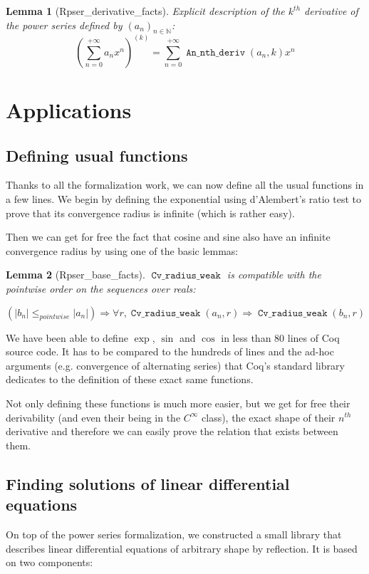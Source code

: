 \documentclass[submission,copyright]{eptcs}
\newcommand{\N}{\mathbb{N}}
\DeclareMathOperator{\Dn}{\mathtt{An\_nth\_deriv}}
\DeclareMathOperator{\cvrw}{\mathtt{Cv\_radius\_weak}}
\newtheorem{lemma}{Lemma}
\begin{document}
\begin{lemma}[Rpser\_derivative\_facts] Explicit description of
the $k^{th}$ derivative of the power series defined by $(a_n)_{n\in \N}$:
$$(\sum_{n=0}^{+\infty} a_n x^n)^{(k)} = \sum_{n=0}^{+\infty}
\Dn{}(a_n,k) x^n$$\end{lemma}

\section{Applications}

\subsection{Defining usual functions}

Thanks to all the formalization work, we can now define all the usual
functions in a few lines. We begin by defining the exponential using
d'Alembert's ratio test to prove that its convergence radius is infinite
(which is rather easy).

Then we can get for free the fact that cosine and sine also have an
infinite convergence radius by using one of the basic lemmas:

\begin{lemma}[Rpser\_base\_facts] $\cvrw{}$ is compatible with the
pointwise order on the sequences over reals:

$$\left(\left|b_n\right| \le_{pointwise} \left|a_n\right|\right)
  \Rightarrow \forall r, \cvrw{}(a_n,r) \Rightarrow \cvrw{}(b_n,r)$$
\end{lemma}

We have been able to define $\exp$, $\sin$ and $\cos$ in less than 80
lines of Coq source code. It has to be compared to the hundreds
of lines and the ad-hoc arguments (e.g. convergence of alternating series)
that Coq's standard library dedicates to the definition of these exact
same functions.

Not only defining these functions is much more easier, but we get for
free their derivability (and even their being in the $C^{\infty}$ class),
the exact shape of their $n^{th}$ derivative and therefore we can easily
prove the relation that exists between them.

\subsection{Finding solutions of linear differential equations}

On top of the power series formalization, we constructed a small library
that describes linear differential equations of arbitrary shape by
reflection. It is based on two components:
\end{document}
